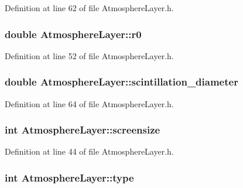 Definition at line 62 of file AtmosphereLayer.h.

\hypertarget{classAtmosphereLayer_a21fe11753b8673dfec2f8909a230635d}{
\subsubsection[{r0}]{\setlength{\rightskip}{0pt plus 5cm}double {\bf AtmosphereLayer::r0}}}
\label{classAtmosphereLayer_a21fe11753b8673dfec2f8909a230635d}


Definition at line 52 of file AtmosphereLayer.h.

\hypertarget{classAtmosphereLayer_aa82dd3a608dae480bd90ade6262f6615}{
\subsubsection[{scintillation\_\-diameter}]{\setlength{\rightskip}{0pt plus 5cm}double {\bf AtmosphereLayer::scintillation\_\-diameter}}}
\label{classAtmosphereLayer_aa82dd3a608dae480bd90ade6262f6615}


Definition at line 64 of file AtmosphereLayer.h.

\hypertarget{classAtmosphereLayer_adf9ae351a2a60df00cbbd3bd68d2fc02}{
\subsubsection[{screensize}]{\setlength{\rightskip}{0pt plus 5cm}int {\bf AtmosphereLayer::screensize}}}
\label{classAtmosphereLayer_adf9ae351a2a60df00cbbd3bd68d2fc02}


Definition at line 44 of file AtmosphereLayer.h.

\hypertarget{classAtmosphereLayer_a18a224d4bfa76d79230990279fdccb70}{
\subsubsection[{type}]{\setlength{\rightskip}{0pt plus 5cm}int {\bf AtmosphereLayer::type}}}
\label{classAtmosphereLayer_a18a224d4bfa76d79230990279fdccb70}


